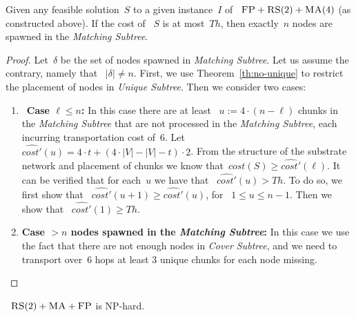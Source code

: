 \documentclass[preprint,12pt]{elsarticle}
\newcommand{\FP}{\textsc{FP}}
\newcommand{\RS}{\textsc{RS}}
\newcommand{\MA}{\textsc{MA}}
\newcommand{\Solution}{S}
\newcommand{\CostSol}{\textit{cost}(\Solution)}
\newcommand{\CostEstimTwo}{\widehat{cost'}}
\newcommand{\numNodes}{\ensuremath{|V|}}
\newcommand{\UnqSubtree}{{{\emph{Unique Subtree}}}}
\newcommand{\MatchSubtree}{{\emph{Matching Subtree}}}
\newcommand{\CoverSubtree}{{\emph{Cover Subtree}}}
\newcommand{\SpawnedMatchSubtree}{\delta}
\newcommand{\Thr}{\ensuremath{Th}}
\begin{document}
\begin{lemma}
  Given any feasible solution~$\Solution$ to a given instance~$I$ of
 ~$\FP+\RS(2)+\MA(4)$ (as constructed above). If the cost of
 ~$\Solution$ is at most~$\Thr$, then exactly~$n$ nodes are spawned in the
  \MatchSubtree.
  \label{th:np-balance}
\end{lemma}
\begin{proof}
  Let~$\SpawnedMatchSubtree$ be the set of nodes spawned in
  {\MatchSubtree}.  Let us assume the contrary, namely that
 ~$|\SpawnedMatchSubtree| \neq n$.  First, we use
  Theorem~\ref{th:no-unique} to restrict the placement of nodes in
  \UnqSubtree. Then we consider two cases:
  \begin{enumerate}
    
    \item~\textbf{Case $\ell \leq n$:} In this case there are at least
   ~$u := 4 \cdot (n-\ell)$ chunks in the {\MatchSubtree} that are not
    processed in the {\MatchSubtree}, each incurring transportation
    cost of~$6$.
    Let
   ~$\CostEstimTwo(u) = 4\cdot t + (4\cdot
    \numNodes - \numNodes - t)\cdot 2$.
    From the structure of the substrate network and placement of
    chunks we know that~$\CostSol \geq \CostEstimTwo(\ell)$.
    It can be verified that for each~$u$ we have that
   ~$\CostEstimTwo(u) > \Thr$. To do so, we first show that
   ~$\CostEstimTwo(u+1) \geq \CostEstimTwo(u)$, for
   ~$1\leq u \leq n-1$. Then we show that
   ~$\CostEstimTwo(1) \geq \Thr$.

    \item \textbf{Case $>n$ nodes spawned in the \MatchSubtree:} In this case
    we use the fact that there are not enough nodes in
    {\CoverSubtree}, and we need to transport over~$6$ hops at least 3
    unique chunks for each node missing.
  \end{enumerate}
\end{proof}

\begin{theorem}
 ~$\RS(2)+\MA+\FP$ is NP-hard.
\end{theorem}
\end{document}
